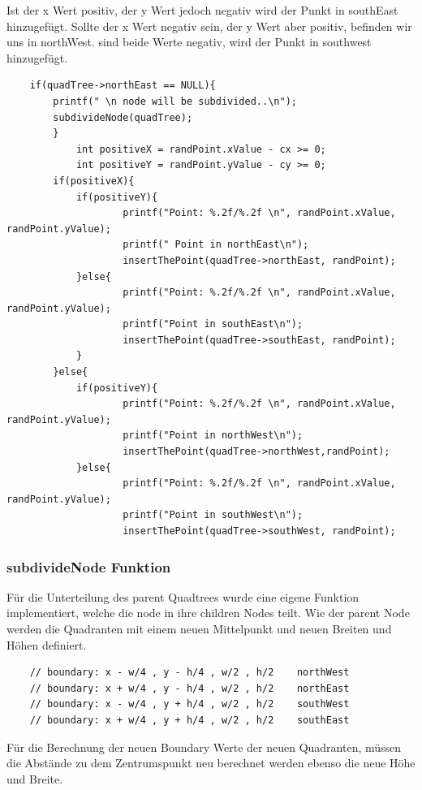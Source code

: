 \documentclass[11pt]{article}
\newcommand{\qts}{Quadtrees }
\begin{document}
Ist der x Wert positiv, der y Wert jedoch negativ wird der Punkt in southEast hinzugefügt. Sollte der x Wert negativ sein, der y Wert aber positiv, befinden wir uns in northWest. sind beide Werte negativ, wird der Punkt in southwest hinzugefügt.  
\begin{lstlisting}
    if(quadTree->northEast == NULL){
        printf(" \n node will be subdivided..\n");
        subdivideNode(quadTree);
        }
            int positiveX = randPoint.xValue - cx >= 0; 
            int positiveY = randPoint.yValue - cy >= 0; 
        if(positiveX){
            if(positiveY){
                    printf("Point: %.2f/%.2f \n", randPoint.xValue, randPoint.yValue);
                    printf(" Point in northEast\n");
                    insertThePoint(quadTree->northEast, randPoint);
            }else{
                    printf("Point: %.2f/%.2f \n", randPoint.xValue, randPoint.yValue);
                    printf("Point in southEast\n");
                    insertThePoint(quadTree->southEast, randPoint);
            }
        }else{
            if(positiveY){
                    printf("Point: %.2f/%.2f \n", randPoint.xValue, randPoint.yValue);
                    printf("Point in northWest\n");
                    insertThePoint(quadTree->northWest,randPoint);
            }else{
                    printf("Point: %.2f/%.2f \n", randPoint.xValue, randPoint.yValue);
                    printf("Point in southWest\n");
                    insertThePoint(quadTree->southWest, randPoint);
\end{lstlisting}


\subsubsection{subdivideNode Funktion}
Für die Unterteilung des parent \qts wurde eine eigene Funktion implementiert, welche die node in ihre children Nodes teilt. Wie der parent Node werden die Quadranten mit einem neuen Mittelpunkt und neuen Breiten und Höhen definiert.
\begin{lstlisting}
    // boundary: x - w/4 , y - h/4 , w/2 , h/2    northWest
    // boundary: x + w/4 , y - h/4 , w/2 , h/2    northEast
    // boundary: x - w/4 , y + h/4 , w/2 , h/2    southWest
    // boundary: x + w/4 , y + h/4 , w/2 , h/2    southEast
\end{lstlisting}
Für die Berechnung der neuen Boundary Werte der neuen Quadranten, müssen die Abstände zu dem Zentrumspunkt neu berechnet werden ebenso die neue Höhe und Breite. 
\end{document}
